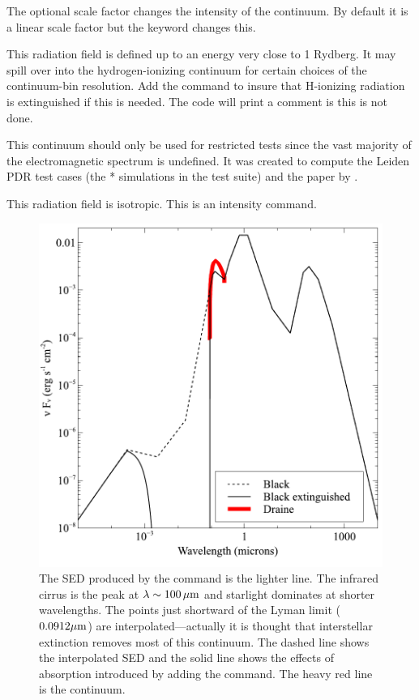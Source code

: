 The optional scale factor changes the intensity
of the continuum.
By default it is a linear scale factor but the keyword  changes this.

This radiation field is defined up to an energy very close to 1 Rydberg.
It may spill over into the hydrogen-ionizing continuum for certain
choices of the continuum-bin resolution.
Add the  command to insure that
H-ionizing radiation is extinguished if this is needed.
The code will print a comment is this is not done.

This continuum should only be used for restricted tests since the vast
majority of the electromagnetic spectrum is undefined.
It was created to compute the Leiden PDR test cases
(the * simulations in the test
suite) and the paper by \citet{Roellig2007}.

This radiation field is isotropic.
This is an intensity command.

\begin{figure}
\centering
\includegraphics{ism_background}
\caption[ISM radiation field]
{\label{fig:ISM_background}The SED produced by the  command is the lighter
line.
The infrared cirrus is the peak at $\lambda \sim  100\, \hbox{$\mu$m} $ and starlight
dominates at shorter wavelengths.
The points just shortward of the Lyman
limit ($0.0912 \hbox{$\mu$m}$) are interpolated---actually it is thought that interstellar
extinction removes most of this continuum.
The dashed line shows the
interpolated SED and the solid line shows the effects of absorption
introduced by adding the  command.
The heavy red line is the  continuum. }
\end{figure}

